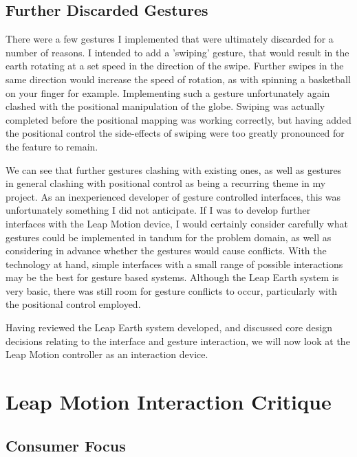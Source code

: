 \documentclass{sigplanconf}
\begin{document}
\subsection{Further Discarded Gestures}

There were a few gestures I implemented that were ultimately discarded for a number of reasons. I intended to add a 'swiping' gesture, that would result in the earth rotating at a set speed in the direction of the swipe. Further swipes in the same direction would increase the speed of rotation, as with spinning a basketball on your finger for example. Implementing such a gesture unfortunately again clashed with the positional manipulation of the globe. Swiping was actually completed before the positional mapping was working correctly, but having added the positional control the side-effects of swiping were too greatly pronounced for the feature to remain.

We can see that further gestures clashing with existing ones, as well as gestures in general clashing with positional control as being a recurring theme in my project. As an inexperienced developer of gesture controlled interfaces, this was unfortunately something I did not anticipate. If I was to develop further interfaces with the Leap Motion device, I would certainly consider carefully what gestures could be implemented in tandum for the problem domain, as well as considering in advance whether the gestures would cause conflicts. With the technology at hand, simple interfaces with a small range of possible interactions may be the best for gesture based systems. Although the Leap Earth system is very basic, there was still room for gesture conflicts to occur, particularly with the positional control employed.

Having reviewed the Leap Earth system developed, and discussed core design decisions relating to the interface and gesture interaction, we will now look at the Leap Motion controller as an interaction device.


\section{Leap Motion Interaction Critique} 
\label{sec:leap_interaction}

\subsection{Consumer Focus}
\end{document}
